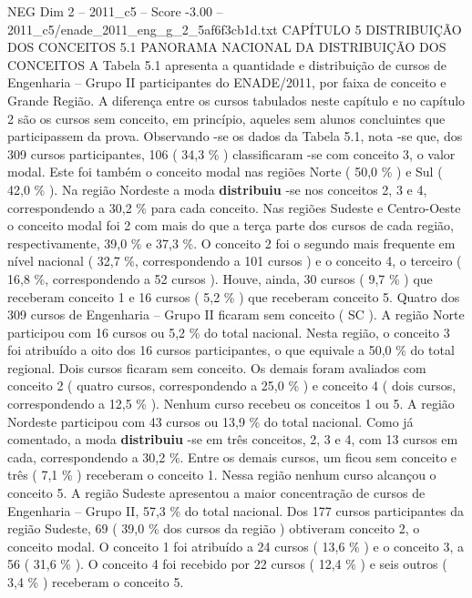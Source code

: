\begin{textsample}{NEG Dim 2 – 2011\_c5 – Score -3.00 – 2011\_c5/enade\_2011\_eng\_g\_2\_5af6f3cb1d.txt}  \label{ex:f2_neg_081}
CAPÍTULO 5 DISTRIBUIÇÃO DOS CONCEITOS 5.1 PANORAMA NACIONAL DA DISTRIBUIÇÃO DOS CONCEITOS A Tabela 5.1 apresenta a quantidade e distribuição de cursos de Engenharia – Grupo II participantes do ENADE/2011, por faixa de conceito e Grande Região.
A diferença entre os cursos tabulados neste capítulo e no capítulo 2 são os cursos sem conceito, em princípio, aqueles sem alunos concluintes que participassem da prova.
Observando -se os dados da Tabela 5.1, nota -se que, dos 309 cursos participantes, 106 ( 34,3 \% ) classificaram -se com conceito 3, o valor modal.
Este foi também o conceito modal nas regiões Norte ( 50,0 \% ) e Sul ( 42,0 \% ).
Na região Nordeste a moda \textbf{distribuiu} -se nos conceitos 2, 3 e 4, correspondendo a 30,2 \% para cada conceito.
Nas regiões Sudeste e Centro-Oeste o conceito modal foi 2 com mais do que a terça parte dos cursos de cada região, respectivamente, 39,0 \% e 37,3 \%.
O conceito 2 foi o segundo mais frequente em nível nacional ( 32,7 \%, correspondendo a 101 cursos ) e o conceito 4, o terceiro ( 16,8 \%, correspondendo a 52 cursos ).
Houve, ainda, 30 cursos ( 9,7 \% ) que receberam conceito 1 e 16 cursos ( 5,2 \% ) que receberam conceito 5.
Quatro dos 309 cursos de Engenharia – Grupo II ficaram sem conceito ( SC ).
A região Norte participou com 16 cursos ou 5,2 \% do total nacional.
Nesta região, o conceito 3 foi atribuído a oito dos 16 cursos participantes, o que equivale a 50,0 \% do total regional.
Dois cursos ficaram sem conceito.
Os demais foram avaliados com conceito 2 ( quatro cursos, correspondendo a 25,0 \% ) e conceito 4 ( dois cursos, correspondendo a 12,5 \% ).
Nenhum curso recebeu os conceitos 1 ou 5.
A região Nordeste participou com 43 cursos ou 13,9 \% do total nacional.
Como já comentado, a moda \textbf{distribuiu} -se em três conceitos, 2, 3 e 4, com 13 cursos em cada, correspondendo a 30,2 \%.
Entre os demais cursos, um ficou sem conceito e três ( 7,1 \% ) receberam o conceito 1.
Nessa região nenhum curso alcançou o conceito 5.
A região Sudeste apresentou a maior concentração de cursos de Engenharia – Grupo II, 57,3 \% do total nacional.
Dos 177 cursos participantes da região Sudeste, 69 ( 39,0 \% dos cursos da região ) obtiveram conceito 2, o conceito modal.
O conceito 1 foi atribuído a 24 cursos ( 13,6 \% ) e o conceito 3, a 56 ( 31,6 \% ).
O conceito 4 foi recebido por 22 cursos ( 12,4 \% ) e seis outros ( 3,4 \% ) receberam o conceito 5.

\end{textsample}
